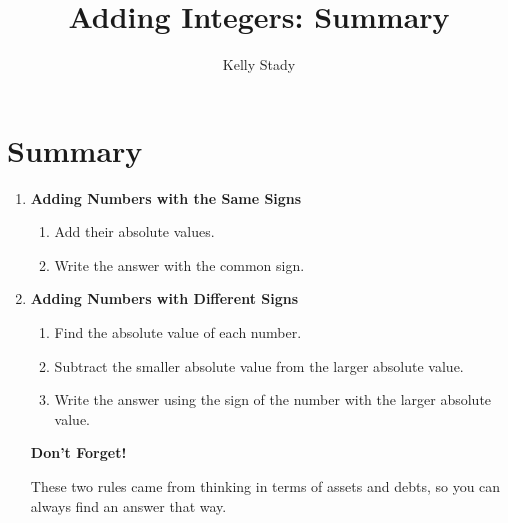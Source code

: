 \documentclass{ximera}
\title{Adding Integers: Summary}   %
\author{Kelly Stady}
\begin{document}
\begin{abstract}

\end{abstract}

\maketitle
\label{xim:AddIntSummary}



\section*{\textbf{Summary}}


\normalsize
\begin{enumerate}
\item \textbf{Adding Numbers with the Same Signs}

\begin{enumerate}
\item Add their absolute values.

\item Write the answer with the common sign.

\end{enumerate}


\item \textbf{Adding Numbers with Different Signs}

\begin{enumerate}
\item Find the absolute value of each number.

\item Subtract the smaller absolute value from the larger absolute value.

\item Write the answer using the sign of the number with the larger absolute value.

\end{enumerate}



\textbf{Don't Forget!}

These two rules came from thinking in terms of assets and debts, so you can always find an answer that way.

\end{enumerate}
\end{document}
